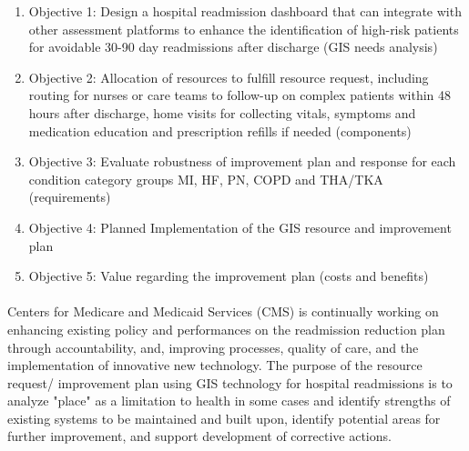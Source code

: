\documentclass[11pt]{article}\usepackage[]{graphicx}\usepackage[]{color}
\begin{document}
\begin{enumerate}
  \item Objective 1: Design a hospital readmission dashboard that can integrate with other
assessment platforms to enhance the identification of high-risk patients for avoidable 30-90 day readmissions after discharge (GIS needs analysis)
  \item	Objective 2: Allocation of resources to fulfill resource request, including routing for 	
nurses or care teams to follow-up on complex patients within 48 hours after discharge, home visits for collecting vitals, symptoms and medication education and prescription refills if needed (components)
  \item	Objective 3: Evaluate robustness of improvement plan and response for each condition category groups MI, HF, PN, COPD and THA/TKA (requirements)
  \item	Objective 4: Planned Implementation of the GIS resource and improvement plan
  \item	Objective 5: Value regarding the improvement plan (costs and benefits)
\end{enumerate}
\paragraph{}

Centers for Medicare and Medicaid Services (CMS) is continually working on enhancing existing policy and performances on the readmission reduction plan through accountability, and, improving processes, quality of care, and the implementation of innovative new technology. The purpose of the resource request/ improvement plan using GIS technology for hospital readmissions is to analyze "place" as a limitation to health in some cases and identify strengths of existing systems to be maintained and built upon, identify potential areas for further improvement, and support development of corrective actions.
\end{document}
